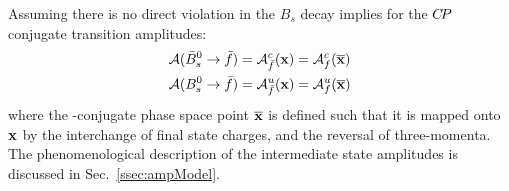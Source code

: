 \clearpage
Assuming there is no direct \CP violation in the $B_s$ decay implies for the ${C\!P}$ conjugate transition amplitudes:
\begin{align}
\mathcal A(\bar B_s^0 \rightarrow \bar f) &=  \mathcal A^c_{\bar f}(\mathbf{x}) = \mathcal A^c_f(\overline{\mathbf{x}})  \\       
\mathcal A(B_s^0 \rightarrow \bar f) &= \mathcal A^u_{\bar f}(\mathbf{x})  = \mathcal A^u_{f}(\overline{\mathbf{x}}) 
\end{align}
where the \CP-conjugate phase space point $\overline{\mathbf{x}}$ is defined such that it is mapped onto $\mathbf{x}$ by the interchange of final state charges, and the reversal of three-momenta.
The phenomenological description of the intermediate state amplitudes is discussed in Sec.~\ref{ssec:ampModel}.
\\

